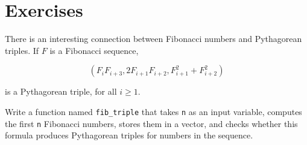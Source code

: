 \section{Exercises}

\begin{ex}

There is an interesting connection between Fibonacci numbers and
Pythagorean triples.  If $F$ is a Fibonacci sequence,

\begin{equation}
(F_i F_{i+3}, 2 F_{i+1} F_{i+2}, F_{i+1}^2 + F_{i+2}^2 )
\end{equation}

is a Pythagorean triple, for all $i \ge 1$.

Write a function named {\tt fib\_triple} that
takes {\tt n} as an input variable, computes 
the first {\tt n} Fibonacci numbers, stores them in a vector,
and checks whether this formula produces Pythagorean triples for numbers in the sequence.

\end{ex}


